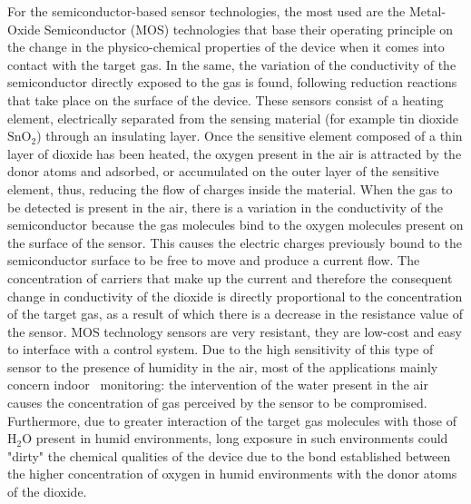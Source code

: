 \documentclass[10pt]{../style_src/imeko_acta}
\begin{document}
For the semiconductor-based sensor technologies, the most used are the Metal-Oxide Semiconductor (MOS) technologies that base their operating principle on the change in the physico-chemical properties of the device when it comes into contact with the target gas. In the same, the variation of the conductivity of the semiconductor directly exposed to the gas is found, following reduction reactions that take place on the surface of the device. These sensors consist of a heating element, electrically separated from the sensing material (for example tin dioxide $\mathrm{SnO_2}$) through an insulating layer. Once the sensitive element composed of a thin layer of dioxide has been heated, the oxygen present in the air is attracted by the donor atoms and adsorbed, or accumulated on the outer layer of the sensitive element, thus, reducing the flow of charges inside the material. When the gas to be detected is present in the air, there is a variation in the conductivity of the semiconductor because the gas molecules bind to the oxygen molecules present on the surface of the sensor. This causes the electric charges previously bound to the semiconductor surface to be free to move and produce a current flow. The concentration of carriers that make up the current and therefore the consequent change in conductivity of the dioxide is directly proportional to the concentration of the target gas, as a result of which there is a decrease in the resistance value of the sensor. MOS technology sensors are very resistant, they are low-cost and easy to interface with a control system. Due to the high sensitivity of this type of sensor to the presence of humidity in the air, most of the applications mainly concern indoor~\cite{PM25_5} monitoring: the intervention of the water present in the air causes the concentration of gas perceived by the sensor to be compromised. Furthermore, due to greater interaction of the target gas molecules with those of H$_2$O present in humid environments, long exposure in such environments could "dirty" the chemical qualities of the device due to the bond established between the higher concentration of oxygen in humid environments with the donor atoms of the dioxide.
\end{document}

